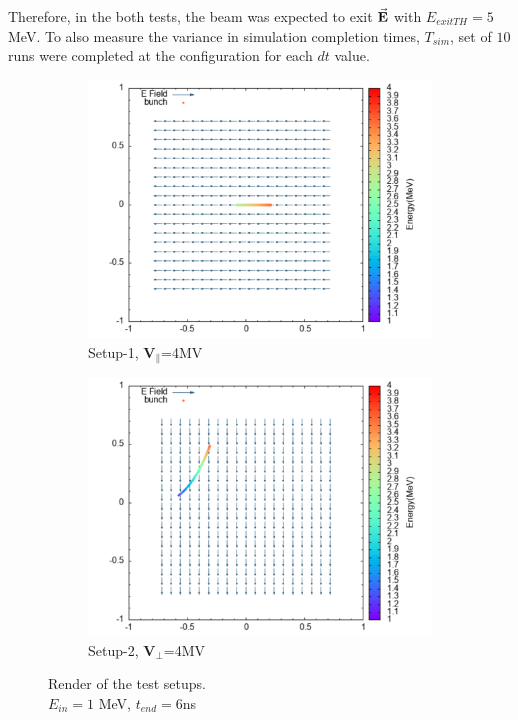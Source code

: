 \documentclass[a4paper,oneside,12pt]{report}
\numberwithin{equation}{chapter}
\begin{document}
Therefore, in the both tests, the beam was expected to exit $\vec{\textbf{E}}$ with $E_{exitTH} = 5$ MeV. 
To also measure the variance in simulation completion times, $T_{sim}$, set of $10$ runs were completed at the configuration for each $dt$ value.

\begin{figure}[H]
    \centering
    \begin{subfigure}{0.8\textwidth}
        \centering
        \includegraphics[width=\linewidth]{./figures/rhodoSim/statE_par.png}
        \caption*{Setup-1, $\textbf{V}_{\parallel}$=4MV}
    \end{subfigure}
    \begin{subfigure}{0.8\textwidth}
        \centering
        \includegraphics[width=\linewidth]{./figures/rhodoSim/statE_perp.png}
        \caption*{Setup-2, $\textbf{V}_{\perp}$=4MV}
    \end{subfigure}
    \caption{Render of the test setups. \\ $E_{in}=1$ MeV, $t_{end}=6$ns}
\end{figure}
\end{document}
